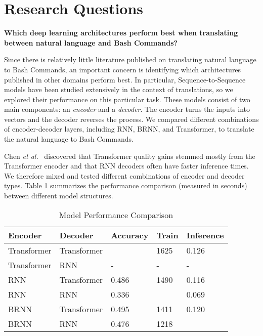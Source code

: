 \documentclass{river-journal}
\begin{document}
\section{Research Questions}
\label{methodology}
\textbf{Which deep learning architectures perform best when translating between natural language and Bash Commands?} 

Since there is relatively little literature published on translating natural language to Bash Commands, an important concern is identifying which architectures published in other domains perform best. In particular, 
Sequence-to-Sequence~\cite{Sutskever2014SequenceTS} models have been studied extensively in the context of translations, so we explored their performance on this particular task. These models consist of two main components: an \emph{encoder} and a \emph{decoder}. The encoder turns the inputs into vectors and the decoder reverses the process. We compared different combinations of encoder-decoder layers, including RNN, BRNN, and Transformer, to translate the natural language to Bash Commands.

Chen \textit{et al.}~\cite{Chen2018TheBO} discovered that Transformer quality gains stemmed mostly from the Transformer encoder and that RNN decoders often have faster inference times. We therefore mixed and tested different combinations of encoder and decoder types. Table \ref{table:models} summarizes the performance comparison (measured in seconds) between different model structures. 
\begin{table}[bhtp]
\caption{\label{table:models} Model Performance Comparison}
\centering
{
\begin{tabular}{lllll}
\hline \textbf{Encoder} & \textbf{Decoder} & \textbf{Accuracy}& \textbf{Train} & \textbf{Inference}
\\\hline
Transformer & Transformer &  & 1625 & 0.126 \\
Transformer & RNN & - & - & - \\
RNN & Transformer & 0.486 & 1490 & 0.116 \\
RNN & RNN & 0.336 &  & 0.069 \\
BRNN & Transformer & 0.495 & 1411 & 0.120 \\
BRNN & RNN & 0.476 & 1218 & \\
\hline
\end{tabular}}
\end{table}
\end{document}

